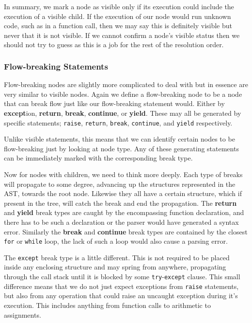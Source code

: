 \documentclass[twoside,a4paper]{report}
\begin{document}
In summary, we mark a node as visible only if its execution could include the execution of a visible child. If the execution of our node would run unknown
code, such as in a function call, then we may say this is definitely visible but never that it is not visible. If we cannot confirm a node's visible status
then we should not try to guess as this is a job for the rest of the resolution order.

\subsubsection{Flow-breaking Statements}

Flow-breaking nodes are slightly more complicated to deal with but in essence are very similar to visible nodes. Again we define a flow-breaking node
to be a node that can break flow just like our flow-breaking statement would. Either by \textbf{except}ion, \textbf{return}, \textbf{break}, \textbf{continue},
or \textbf{yield}. These may all be generated by specific statements; \texttt{raise}, \texttt{return}, \texttt{break}, \texttt{continue}, and \texttt{yield}
respectively.

Unlike visible statements, this means that we can identify certain nodes to be flow-breaking just by looking at node type. Any of these generating statements
can be immediately marked with the corresponding break type.

Now for nodes with children, we need to think more deeply. Each type of breaks will propagate to some degree, advancing up the structures represented in the
AST, towards the root node. Likewise they all have a certain structure, which if present in the tree, will catch the break and end the propagation. The
\textbf{return} and \textbf{yield} break types are caught by the encompassing function declaration, and there has to be such a declaration or the parser
would have generated a syntax error. Similarly the \textbf{break} and \textbf{continue} break types are contained by the closest \texttt{for} or
\texttt{while} loop, the lack of such a loop would also cause a parsing error.

The \texttt{except} break type is a little different. This is not required to be placed inside any enclosing structure and may spring from anywhere, propagating
through the call stack until it is blocked by some \texttt{try}-\texttt{except} clause. This small difference means that we do not just expect exceptions
from \texttt{raise} statements, but also from any operation that could raise an uncaught exception during it's execution. This
includes anything from function calls to arithmetic to assignments.
\end{document}

